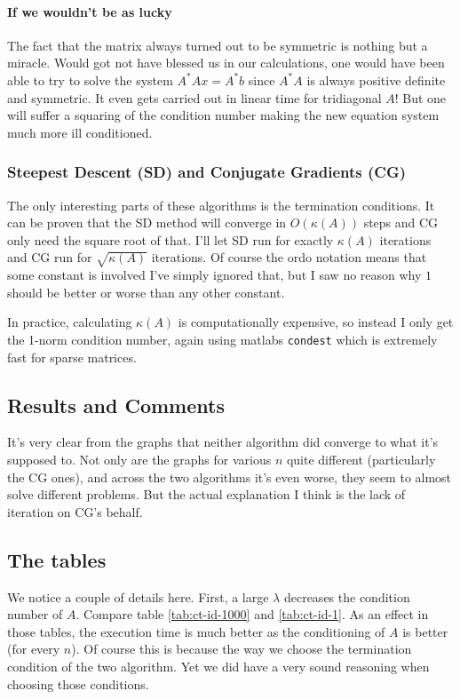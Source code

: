 \documentclass[a4paper,11pt]{article}
\begin{document}
\paragraph{If we wouldn't be as lucky}

The fact that the matrix always turned out to be symmetric is nothing
but a miracle. Would got not have blessed us in our calculations, one
would have been able to try to solve the system $A^{*}Ax=A^{*}b$ since
$A^*A$ is always positive definite and symmetric.  It even gets carried
out in linear time for tridiagonal $A$! But one will suffer a squaring
of the condition number making the new equation system much more ill
conditioned.

\subsubsection{Steepest Descent (SD) and Conjugate Gradients (CG)}

The only interesting parts of these algorithms is the termination conditions.
It can be proven that the SD method will converge in $O(\kappa(A))$ steps and
CG only need the square root of that.  I'll let SD run for exactly $\kappa(A)$
iterations and CG run for $\sqrt{\kappa(A)}$ iterations. Of course the ordo
notation means that some constant is involved I've simply ignored that, but I
saw no reason why $1$ should be better or worse than any other constant.

In practice, calculating $\kappa(A)$ is computationally expensive, so instead I
only get the 1-norm condition number, again using matlabs \texttt{condest}
which is extremely fast for sparse matrices.

\subsection{Results and Comments}

It's very clear from the graphs that neither algorithm did converge to what
it's supposed to. Not only are the graphs for various $n$ quite different
(particularly the CG ones), and across the two algorithms it's even worse, they
seem to almost solve different problems. But the actual explanation I think is
the lack of iteration on CG's behalf.

\subsection{The tables}

We notice a couple of details here. First, a large $\lambda$ decreases the
condition number of $A$. Compare table \ref{tab:ct-id-1000} and
\ref{tab:ct-id-1}. As an effect in those tables, the execution time is
much better as the conditioning of $A$ is better (for every $n$). Of
course this is because the way we choose the termination condition of
the two algorithm. Yet we did have a very sound reasoning when choosing
those conditions.
\end{document}
